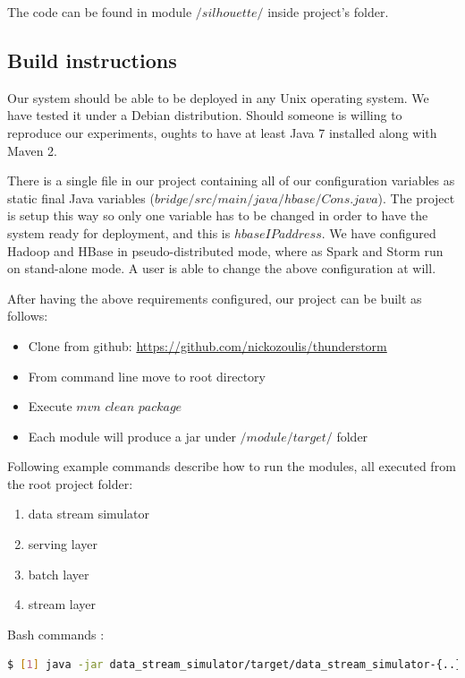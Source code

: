 \documentclass{lmproj}
\begin{document}
The code can be found in module $/silhouette/$ inside project's folder.

\subsection{Build instructions}

Our system should be able to be deployed in any Unix operating system. We have tested it under a Debian distribution. Should someone is willing to reproduce our experiments, oughts to have at least Java 7 installed along with Maven 2. 

There is a single file in our project containing all of our configuration variables as static final Java variables ($bridge/src/main/java/hbase/Cons.java$). The project is setup this way so only one variable has to be changed in order to have the system ready for deployment, and this is $hbaseIPaddress$. We have configured Hadoop and HBase in pseudo-distributed mode, where as Spark and Storm run on stand-alone mode. A user is able to change the above configuration at will. 

After having the above requirements configured, our project can be built as follows:

\begin{itemize}
	\item Clone from github:   \url{https://github.com/nickozoulis/thunderstorm} 
	\item From command line move to root directory
	\item Execute $mvn$ $clean$ $package$ 
	\item Each module will produce a jar under $/module/target/$ folder
\end{itemize}

Following example commands describe how to run the modules, all executed from the root project folder:

\begin{enumerate}
	\item data stream simulator
	\item serving layer
	\item batch layer
	\item stream layer
\end{enumerate}

\noindent Bash commands :
\begin{lstlisting}[language=bash]
$ [1] java -jar data_stream_simulator/target/data_stream_simulator-{..}-jar-with-dependencies.jar -f {filepath to normalized dataset}
\end{lstlisting}
\end{document}
